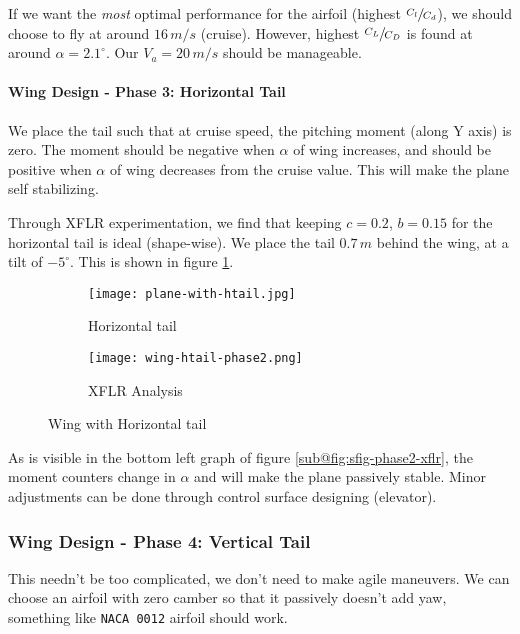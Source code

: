 If we want the \emph{most} optimal performance for the airfoil (highest $\sfrac{C_l}{C_d}$), we should choose to fly at around $16\,m/s$ (cruise). However, highest $\sfrac{C_L}{C_D}$ is found at around $\alpha = 2.1^\circ$. Our $V_a = 20\,m/s$ should be manageable.

\paragraph*{Wing Design - Phase 3: Horizontal Tail}

We place the tail such that at cruise speed, the pitching moment (along Y axis) is zero. The moment should be negative when $\alpha$ of wing increases, and should be positive when $\alpha$ of wing decreases from the cruise value. This will make the plane self stabilizing.

Through XFLR experimentation, we find that keeping $c = 0.2$, $b = 0.15$ for the horizontal tail is ideal (shape-wise). We place the tail $0.7\,m$ behind the wing, at a tilt of $-5^\circ$. This is shown in figure \ref{fig:sfig-wing-htail}.

\begin{figure}[ht]
    \centering
    \begin{subfigure}[b]{0.4\textwidth}
        \texttt{[image: plane-with-htail.jpg]}
        \caption{Horizontal tail}
        \label{fig:sfig-wing-htail}
    \end{subfigure}
    \begin{subfigure}[b]{0.4\textwidth}
        \texttt{[image: wing-htail-phase2.png]}
        \caption{XFLR Analysis}
        \label{fig:sfig-phase2-xflr}
    \end{subfigure}
    \caption{Wing with Horizontal tail}
\end{figure}

As is visible in the bottom left graph of figure \ref{sub@fig:sfig-phase2-xflr}, the moment counters change in $\alpha$ and will make the plane passively stable. Minor adjustments can be done through control surface designing (elevator).

\subsubsection*{Wing Design - Phase 4: Vertical Tail}

This needn't be too complicated, we don't need to make agile maneuvers. We can choose an airfoil with zero camber so that it passively doesn't add yaw, something like \texttt{NACA 0012} airfoil should work.
